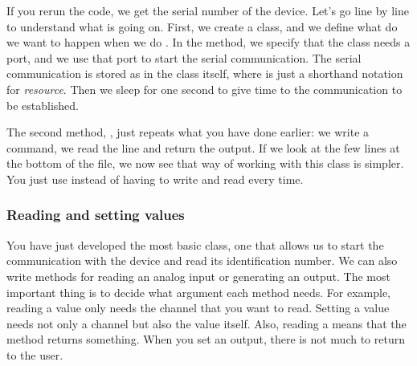 If you rerun the code, we get the serial number of the device. Let's go line by line to understand what is going on. First, we create a class, and we define what do we want to happen when we do . In the  method, we specify that the class needs a port, and we use that port to start the serial communication. The serial communication is stored as  in the class itself, where  is just a shorthand notation for \textit{resource}. Then we sleep for one second to give time to the communication to be established.

The second method, , just repeats what you have done earlier: we write a command, we read the line and return the output. If we look at the few lines at the bottom of the file, we now see that way of working with this class is simpler. You just use  instead of having to write and read every time.



\subsubsection{Reading and setting values}
You have just developed the most basic class, one that allows us to start the communication with the device and read its identification number. We can also write methods for reading an analog input or generating an output. The most important thing is to decide what argument each method needs. For example, reading a value only needs the channel that you want to read. Setting a value needs not only a channel but also the value itself. Also, reading a means that the method returns something. When you set an output, there is not much to return to the user.


